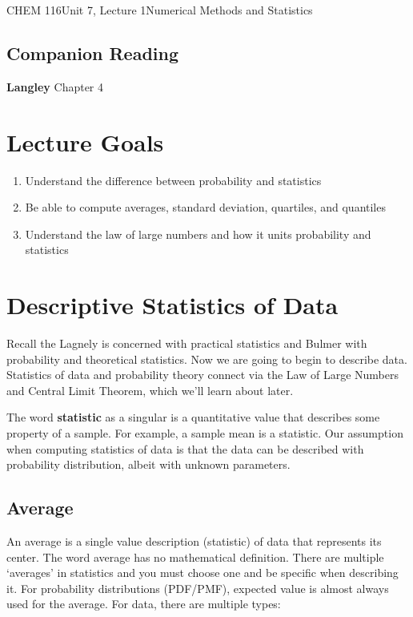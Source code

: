 \documentclass{article}
\begin{document}
\begin{tdoc}{CHEM 116}{Unit 7, Lecture 1}{Numerical Methods and Statistics}

  \subsection*{Companion Reading}
  \textbf{Langley} Chapter 4

  \section{Lecture Goals}

  \begin{enumerate}
  \item Understand the difference between probability and statistics
  \item Be able to compute averages, standard deviation, quartiles, and quantiles
  \item Understand the law of large numbers and how it units probability and statistics

  \end{enumerate}



\section{Descriptive Statistics of Data}
Recall the Lagnely is concerned with practical statistics and Bulmer
with probability and theoretical statistics. Now we are going to begin
to describe data. Statistics of data and probability
theory connect via the Law of Large Numbers and Central Limit Theorem, which we'll learn about later.

The word {\bf statistic} as a singular is a quantitative value that
describes some property of a sample. For example, a sample mean is a
statistic. Our assumption when computing statistics of data is that the data can be described with probability distribution, albeit with unknown parameters.

\subsection{Average}
An average is a single value description (statistic) of data that represents its
center. The word average has no mathematical definition. There are
multiple `averages' in statistics and you must choose one and be
specific when describing it. For probability distributions (PDF/PMF),
expected value is almost always used for the average. For data, there
are multiple types:


\end{tdoc}
\end{document}
